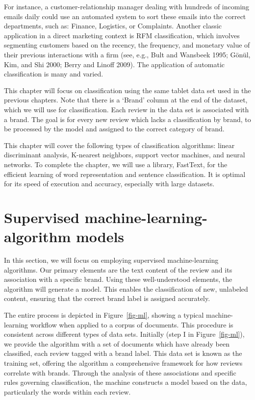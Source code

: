 For instance, a customer-relationship manager dealing with hundreds of
incoming emails daily could use an automated system to sort these emails
into the correct departments, such as: Finance, Logistics, or Complaints. Another classic application in a direct marketing
context is RFM classification, which involves segmenting customers based
on the recency, the frequency, and monetary value of their previous
interactions with a firm (see, e.g., Bult and Wansbeek 1995; Gönül, Kim, and Shi 2000; Berry and Linoff 2009). The application
of automatic classification is many and varied.

This chapter will focus on classification using the same tablet data set
used in the previous chapters. Note that there is a `Brand' column at
the end of the dataset, which we will use for classification. Each
review in the data set is associated with a brand. The goal is for every
new review which lacks a classification by brand, to be processed by the
model and assigned to the correct category of brand.

This chapter will
cover the following types of classification algorithms: linear discriminant analysis, K-nearest neighbors, support vector
machines, and neural networks. To complete the chapter, we will use a
library, FastText, for the efficient learning of word representation
and sentence classification. It is optimal for its speed of execution
and accuracy, especially with large datasets.

\section{Supervised machine-learning-algorithm
models}\label{supervised-machine-learning-algorithm-models}

In this section, we will focus on employing supervised machine-learning
algorithms. Our primary elements are the text content of the review and
its association with a specific brand. Using these well-understood
elements, the algorithm will generate a model. This enables the
classification of new, unlabeled content, ensuring that the correct
brand label is assigned accurately.

The entire process is depicted in Figure~\ref{fig-ml}, showing a
typical machine-learning workflow when applied to a corpus of documents. This
procedure is consistent across different types of data sets.
Initially (step I in Figure~\ref{fig-ml}), we provide the algorithm with
a set of documents which have already been classified, each review tagged
with a brand label. This data set is known as the training set,
offering the algorithm a comprehensive framework for how reviews
correlate with brands. Through the analysis of these associations and
specific rules governing classification, the machine constructs a model based on
the data, particularly the words within each review.

